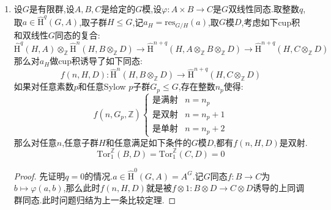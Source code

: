 \begin{enumerate}
\begin{proof}
		记$\overline{A'}=\mathrm{Ind}^G(A')$,记典范$G$嵌入$i:A'\to\overline{A'}$.再记$A^*=A\oplus\overline{A'}$.记$G$单同态$\theta=(f,i):A'\to A^*$.再记$\mathrm{coker}\theta=A''$.于是有短正合列:$$\xymatrix{0\ar[r]&A'\ar[r]^{\theta}&A^*\ar[r]&A''\ar[r]&0}$$
		按照$\overline{A'}$是上同调平凡$G$模,就有$A$的上同调和$A^*$的上同调一致.条件告诉我们对$q=n_p,n_p+1$有:$$\widehat{\mathrm{H}}^q(G_p,A'')=0$$
		我们解释过此时有$A''$是上同调平凡$G$模.另外按照$A'$是交换群$\overline{A'}$的直和项,于是$A'$也是交换群$A^*$的直和项.但是这里交换群$A^*$是$A$和若干$A'$的直和,于是从条件得到$\mathrm{Tor}_1^{\mathbb{Z}}(A^*,B)=0$,进而有$\mathrm{Tor}_1^{\mathbb{Z}}(A'',B)=0$.进而有$A''\otimes_{\mathbb{Z}}B$是上同调平凡$G$模.考虑如下短正合列:
		$$\xymatrix{0\ar[r]&A'\otimes_{\mathbb{Z}}B\ar[r]&A^*\otimes_{\mathbb{Z}}B\ar[r]&A''\otimes_{\mathbb{Z}}B\ar[r]&0}$$
		就得到典范同构:
		$$\widehat{\mathrm{H}}^i(H,A'\otimes_{\mathbb{Z}}B)\cong\widehat{\mathrm{H}}^i(H,A^*\otimes_{\mathbb{Z}}B)$$
		我们还有典范同构:
		$$\widehat{\mathrm{H}}^i(H,A^*\otimes_{\mathbb{Z}}B)\cong\widehat{\mathrm{H}}^i(H,A\otimes_{\mathbb{Z}}B)$$
		得证.
	\end{proof}
	\item 设$G$是有限群,设$A,B,C$是给定的$G$模,设$\varphi:A\times B\to C$是$G$双线性同态.取整数$q$,取$a\in\widehat{\mathrm{H}}^q(G,A)$,取子群$H\le G$,记$a_H=\mathrm{res}_{G/H}(a)$,取$G$模$D$,考虑如下cup积和双线性$G$同态的复合:
	$$\widehat{\mathrm{H}}^q(H,A)\otimes_{\mathbb{Z}}\widehat{\mathrm{H}}^n(H,B\otimes_{\mathbb{Z}}D)\to\widehat{\mathrm{H}}^{n+q}(H,A\otimes_{\mathbb{Z}}B\otimes_{\mathbb{Z}}D)\to\widehat{\mathrm{H}}^{n+q}(H,C\otimes_{\mathbb{Z}}D)$$
	那么对$a_H$做cup积诱导了如下同态:
	$$f(n,H,D):\widehat{\mathrm{H}}^n(H,B\otimes_{\mathbb{Z}}D)\to\widehat{\mathrm{H}}^{n+q}(H,C\otimes_{\mathbb{Z}}D)$$
	如果对任意素数$p$和任意Sylow $p$子群$G_p\le G$,存在整数$n_p$使得:
	$$f(n,G_p,\mathbb{Z})\left\{\begin{array}{cc}\text{是满射}&n=n_p\\\text{是双射}&n=n_p+1\\\text{是单射}&n=n_p+2\end{array}\right.$$
	那么对任意$n$,任意子群$H$和任意满足如下条件的$G$模$D$,都有$f(n,H,D)$是双射.
	$$\mathrm{Tor}^{\mathbb{Z}}_1(B,D)=\mathrm{Tor}^{\mathbb{Z}}_1(C,D)=0$$
	\begin{proof}
		
		先证明$q=0$的情况.$a\in\widehat{\mathrm{H}}^0(G,A)=A^G$.记$G$同态$f:B\to C$为$b\mapsto\varphi(a,b)$,那么此时$f(n,H,D)$就是被$f\otimes1:B\otimes D\to C\otimes D$诱导的上同调群同态.此时问题归结为上一条比较定理.
		

\end{proof}
\end{enumerate}
